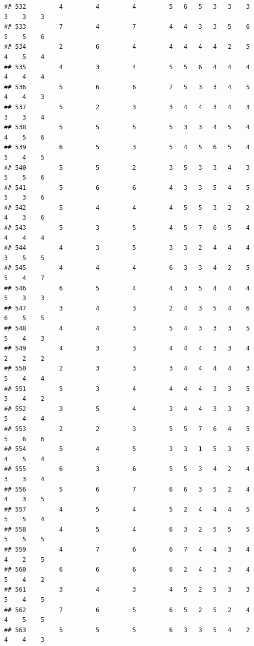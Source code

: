 \documentclass[
]{article}
\begin{document}
\begin{verbatim}
## 532         4         4         4         5   6   5   3   3    3    3    3    3
## 533         7         4         7         4   4   3   3   5    6    5    5    6
## 534         2         6         4         4   4   4   4   2    5    4    5    4
## 535         4         3         4         5   5   6   4   4    4    4    4    4
## 536         5         6         6         7   5   3   3   4    5    4    4    3
## 537         5         2         3         3   4   4   3   4    3    3    3    4
## 538         5         5         5         5   3   3   4   5    4    4    5    6
## 539         6         5         3         5   4   5   6   5    4    5    4    5
## 540         5         5         2         3   5   3   3   4    3    5    5    6
## 541         5         6         6         4   3   3   5   4    5    5    3    6
## 542         5         4         4         4   5   5   3   2    2    4    3    6
## 543         5         3         5         4   5   7   6   5    4    4    4    4
## 544         4         3         5         3   3   2   4   4    4    3    5    5
## 545         4         4         4         6   3   3   4   2    5    5    4    7
## 546         6         5         4         4   3   5   4   4    4    5    3    3
## 547         3         4         3         2   4   3   5   4    6    6    5    5
## 548         4         4         3         5   4   3   3   3    5    5    4    3
## 549         4         3         3         4   4   4   3   3    4    2    2    2
## 550         2         3         3         3   4   4   4   4    3    5    4    4
## 551         5         3         4         4   4   4   3   3    5    5    4    2
## 552         3         5         4         3   4   4   3   3    3    5    4    4
## 553         2         2         3         5   5   7   6   4    5    5    6    6
## 554         5         4         5         3   3   1   5   3    5    4    5    4
## 555         6         3         6         5   5   3   4   2    4    3    3    4
## 556         5         6         7         6   6   3   5   2    4    4    3    5
## 557         4         5         4         5   2   4   4   4    5    5    5    4
## 558         4         5         4         6   3   2   5   5    5    5    5    5
## 559         4         7         6         6   7   4   4   3    4    4    2    5
## 560         6         6         6         6   2   4   3   3    4    5    4    2
## 561         3         4         3         4   5   2   5   3    3    5    4    5
## 562         7         6         5         6   5   2   5   2    4    4    5    5
## 563         5         5         5         6   3   3   5   4    2    4    4    3

\end{verbatim}
\end{document}
